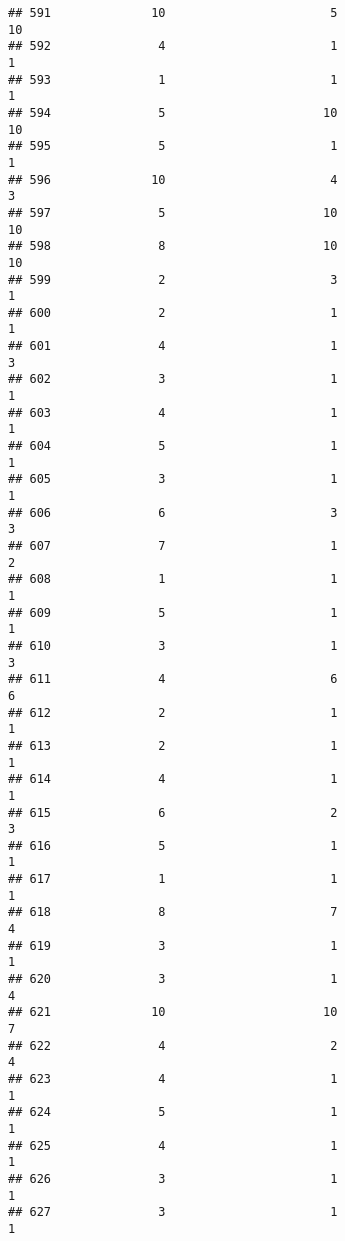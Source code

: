 \documentclass[
]{article}
\begin{document}
\begin{verbatim}
## 591              10                       5                       10
## 592               4                       1                        1
## 593               1                       1                        1
## 594               5                      10                       10
## 595               5                       1                        1
## 596              10                       4                        3
## 597               5                      10                       10
## 598               8                      10                       10
## 599               2                       3                        1
## 600               2                       1                        1
## 601               4                       1                        3
## 602               3                       1                        1
## 603               4                       1                        1
## 604               5                       1                        1
## 605               3                       1                        1
## 606               6                       3                        3
## 607               7                       1                        2
## 608               1                       1                        1
## 609               5                       1                        1
## 610               3                       1                        3
## 611               4                       6                        6
## 612               2                       1                        1
## 613               2                       1                        1
## 614               4                       1                        1
## 615               6                       2                        3
## 616               5                       1                        1
## 617               1                       1                        1
## 618               8                       7                        4
## 619               3                       1                        1
## 620               3                       1                        4
## 621              10                      10                        7
## 622               4                       2                        4
## 623               4                       1                        1
## 624               5                       1                        1
## 625               4                       1                        1
## 626               3                       1                        1
## 627               3                       1                        1

\end{verbatim}
\end{document}
